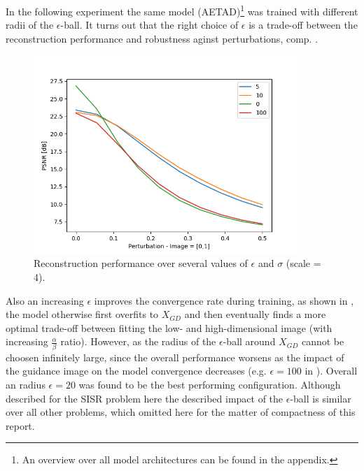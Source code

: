 In the following experiment the same model (AETAD)\footnote{An overview over
all model architectures can be found in the appendix.} was trained with different
radii of the $\epsilon$-ball. It turns out that the right choice of $\epsilon$
is a trade-off between the reconstruction performance and robustness aginst
perturbations, comp. .

\begin{figure}[!htbp]
	\centering
	\includegraphics[width=10cm]{figures/epsball_perturbation}
	\caption{Reconstruction performance over several values of $\epsilon$
  and $\sigma$ (scale = 4).}
  \label{fig:epsball_perturbation}
\end{figure}

Also an increasing
$\epsilon$ improves the convergence rate during training, as shown in
, the model otherwise first overfits to $X_{GD}$
and then eventually finds a more optimal trade-off between fitting the
low- and high-dimensional image (with increasing $\frac{\alpha}{\beta}$ ratio).
However, as  the radius of the $\epsilon$-ball
around $X_{GD}$ cannot be choosen infinitely large, since the overall performance
worsens as the impact of the guidance image on the model convergence decreases
(e.g. $\epsilon = 100$ in ). Overall an
radius $\epsilon = 20$ was found to be the best performing configuration.
Although described for the \ac{SISR} problem here the described impact of
the $\epsilon$-ball is similar over all other problems, which omitted here
for the matter of compactness of this report.

